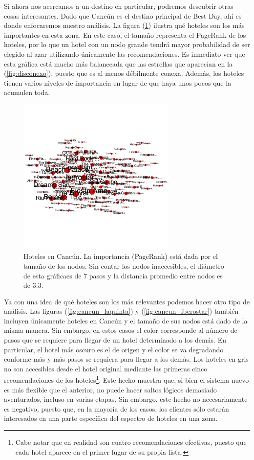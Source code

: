 \documentclass[12pt]{report}
\begin{document}
Si ahora nos acercamos a un destino en particular, podremos descubrir otras cosas interesantes. Dado que Cancún es el destino principal de Best Day, ahí es donde enfocaremos nuestro análisis. La figura (\ref{fig:cancun}) ilustra qué hoteles son los más importantes en esta zona. En este caso, el tamaño representa el PageRank de los hoteles, por lo que un hotel con un nodo grande tendrá mayor probabilidad de ser elegido al azar utilizando únicamente las recomendaciones. Es inmediato ver que esta gráfica está mucho más balanceada que las estrellas que aparecían en la (\ref{fig:disconexo}), puesto que es al menos débilmente conexa. Además, los hoteles tienen varios niveles de importancia en lugar de que haya unos pocos que la acumulen toda.

\begin{figure}[ht]
	\centering
	\includegraphics[width=0.70\textwidth, angle=0,
		trim = 0 900 0 900, clip]{imagenes/cancun.png}
	\caption{\label{fig:cancun} Hoteles en Cancún. La importancia (PageRank) está dada por el tamaño de los nodos. Sin contar los nodos inaccesibles, el diámetro de esta gráficaes de 7 pasos y la distancia promedio entre nodos es de 3.3.}
\end{figure}

Ya con una idea de qué hoteles son los más relevantes podemos hacer otro tipo de análisis. Las figuras (\ref{fig:cancun_laquinta}) y (\ref{fig:cancun_iberostar}) también incluyen únicamente hoteles en Cancún y el tamaño de sus nodos está dado de la misma manera. Sin embargo, en estos casos el color corresponde al número de pasos que se requiere para llegar de un hotel determinado a los demás. En particular, el hotel más oscuro es el de origen y el color se va degradando conforme más y más pasos se requiera para llegar a los demás. Los hoteles en gris no son accesibles desde el hotel original mediante las primeras cinco recomendaciones de los hoteles\footnote{Cabe notar que en realidad son cuatro recomendaciones efectivas, puesto que cada hotel aparece en el primer lugar de su propia lista.}. Este hecho muestra que, si bien el sistema nuevo es más flexible que el anterior, no puede hacer saltos lógicos demasiado aventurados, incluso en varias etapas. Sin embargo, este hecho no necesariamente es negativo, puesto que, en la mayoría de los casos, los clientes sólo estarán interesados en una parte específica del espectro de hoteles en una zona.
\end{document}
